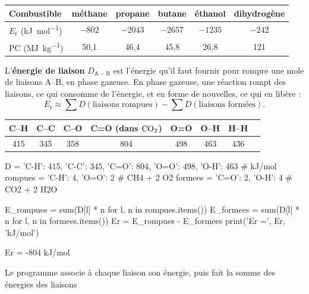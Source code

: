 \begin{propriete}
\par\smallskip\noindent\hfill\begin{tabular}{lccccc}
\toprule
Combustible & méthane & propane & butane & éthanol & dihydrogène \\
\midrule
$E_\mathrm{r}$ (\unit{kJ.mol^{-1}}) & $-802$ & $-2043$ & $-2657$ & $-1235$ & $-242$ \\
PC (\unit{MJ.kg^{-1}}) & 50,1 & 46,4 & 45,8 & 26,8 & 121 \\
\bottomrule
\end{tabular}\hfill\null\par\smallskip
\end{propriete}
\begin{definition}
L'\textbf{énergie de liaison} $D_{\mathrm{A-B}}$ est l'énergie qu'il faut fournir pour rompre une mole de liaisons A--B, en phase
gazeuse. En phase gazeuse, une réaction rompt des liaisons, ce qui consomme de l'énergie, et en forme de nouvelles, ce
qui en libère :
\[E_\mathrm{r}\approx\sum D(\text{liaisons rompues})-\sum D(\text{liaisons formées}).\]
\end{definition}
\begin{propriete}
\par\smallskip\noindent\hfill\begin{tabular}{cccccccc}
\toprule
C--H & C--C & C--O & C=O (dans $\ce{CO2}$) & O=O & O--H & H--H \\
\midrule
415 & 345 & 358 & 804 & 498 & 463 & 436 \\
\bottomrule
\end{tabular}\hfill\null\par\smallskip
\end{propriete}
\begin{python}
D = {'C-H': 415, 'C-C': 345, 'C=O': 804, 'O=O': 498, 'O-H': 463}   # kJ/mol
rompues = {'C-H': 4, 'O=O': 2}           # CH4 + 2 O2
formees = {'C=O': 2, 'O-H': 4}           # CO2 + 2 H2O

E_rompues = sum(D[l] * n for l, n in rompues.items())
E_formees = sum(D[l] * n for l, n in formees.items())
Er = E_rompues - E_formees
print('Er =', Er, 'kJ/mol')
\end{python}
\begin{console}
Er = -804 kJ/mol
\end{console}
\noindent{} Le programme associe à chaque liaison son énergie, puis fait la somme des énergies des liaisons
